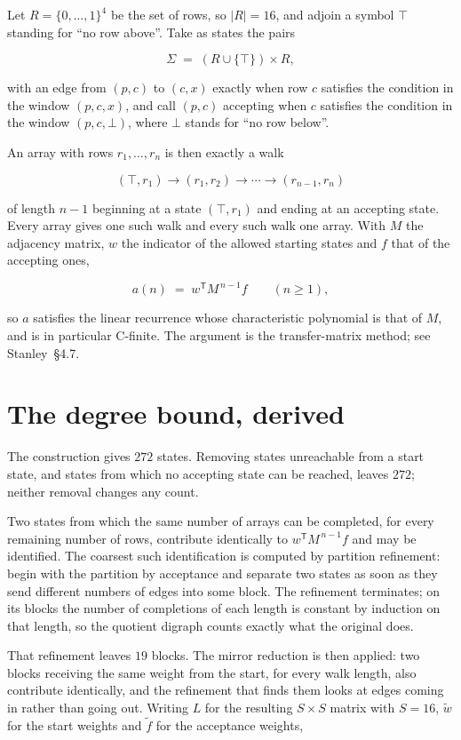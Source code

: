 \documentclass[11pt]{article}
\theoremstyle{definition}
\begin{document}
Let $R = \{0,\dots,1\}^{4}$ be the set of rows, so $|R| = 16$, and adjoin a symbol $\top$ standing for ``no row above''. Take as states the pairs

\[\Sigma \;=\; (R \cup \{\top\}) \times R,\]

with an edge from $(p,c)$ to $(c,x)$ exactly when row $c$ satisfies the condition in the window $(p,c,x)$, and call $(p,c)$ accepting when $c$ satisfies the condition in the window $(p,c,\bot)$, where $\bot$ stands for ``no row below''.

An array with rows $r_1,\dots,r_n$ is then exactly a walk

\[(\top,r_1) \to (r_1,r_2) \to \cdots \to (r_{n-1},r_n)\]

of length $n-1$ beginning at a state $(\top,r_1)$ and ending at an accepting state. Every array gives one such walk and every such walk one array. With $M$ the adjacency matrix, $w$ the indicator of the allowed starting states and $f$ that of the accepting ones,

\[a(n) \;=\; w^{\mathsf T} M^{\,n-1} f \qquad (n \ge 1),\]

so $a$ satisfies the linear recurrence whose characteristic polynomial is that of $M$, and is in particular C-finite. The argument is the transfer-matrix method; see Stanley~\S4.7.

\section{The degree bound, derived}

The construction gives $272$ states. Removing states unreachable from a start state, and states from which no accepting state can be reached, leaves $272$; neither removal changes any count.

Two states from which the same number of arrays can be completed, for every remaining number of rows, contribute identically to $w^{\mathsf T}M^{\,n-1}f$ and may be identified. The coarsest such identification is computed by partition refinement: begin with the partition by acceptance and separate two states as soon as they send different numbers of edges into some block. The refinement terminates; on its blocks the number of completions of each length is constant by induction on that length, so the quotient digraph counts exactly what the original does.

That refinement leaves $19$ blocks. The mirror reduction is then applied: two blocks receiving the same weight from the start, for every walk length, also contribute identically, and the refinement that finds them looks at edges coming in rather than going out. Writing $L$ for the resulting $S \times S$ matrix with $S = 16$, $\tilde w$ for the start weights and $\tilde f$ for the acceptance weights,
\end{document}
